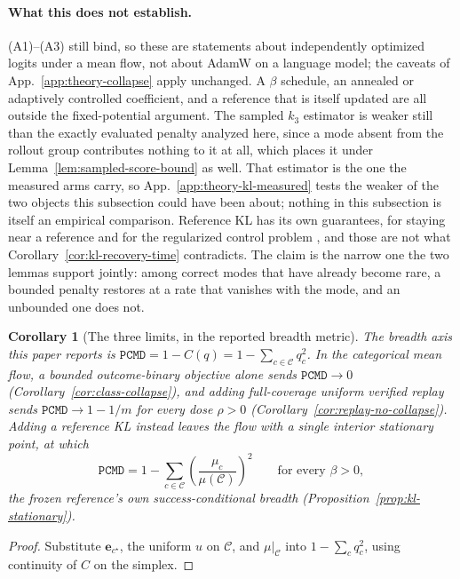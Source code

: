 \documentclass{article}
\newcommand{\1}{\mathbf 1}
\newcommand{\pmd}{\texttt{PCMD}}
\newtheorem{corollary}[lemma]{Corollary}
\theoremstyle{remark}
\theoremstyle{definition}
\theoremstyle{plain}
\begin{document}
\paragraph{What this does not establish.} (A1)--(A3) still bind, so these are
statements about independently optimized logits under a mean flow, not about
AdamW on a language model; the caveats of
App.~\ref{app:theory-collapse} apply unchanged. A $\beta$ schedule, an
annealed or adaptively controlled coefficient, and a reference that is itself
updated are all outside the fixed-potential argument. The sampled $k_3$
estimator is weaker still than the exactly evaluated penalty analyzed here,
since a mode absent from the rollout group contributes nothing to it at all,
which places it under Lemma~\ref{lem:sampled-score-bound} as well. That
estimator is the one the measured arms carry, so
App.~\ref{app:theory-kl-measured} tests the weaker of the two objects this
subsection could have been about; nothing in this subsection is itself an
empirical comparison. Reference KL has its own guarantees, for staying near
a reference and for the regularized control problem
\citep{geist2019regmdp,vieillard2020kl}, and those are not what
Corollary~\ref{cor:kl-recovery-time} contradicts. The claim is the narrow one
the two lemmas support jointly: among correct modes that have already become
rare, a bounded penalty restores at a rate that vanishes with the mode, and an
unbounded one does not.

\begin{corollary}[The three limits, in the reported breadth metric]
\label{cor:pmd-limits}
The breadth axis this paper reports is
$\pmd{}=1-C(q)=1-\sum_{c\in\mathcal C}q_c^2$. In the categorical mean flow, a
bounded outcome-binary objective alone sends $\pmd{}\to0$
(Corollary~\ref{cor:class-collapse}), and adding full-coverage uniform verified
replay sends $\pmd{}\to1-1/m$ for every dose $\rho>0$
(Corollary~\ref{cor:replay-no-collapse}). Adding a reference KL instead leaves
the flow with a single interior stationary point, at which
\[
 \pmd{}=1-\sum_{c\in\mathcal C}
   \left(\frac{\mu_c}{\mu(\mathcal C)}\right)^{\!2}
 \qquad\text{for every }\beta>0,
\]
the frozen reference's own success-conditional breadth
(Proposition~\ref{prop:kl-stationary}).
\end{corollary}

\begin{proof}
Substitute $\mathbf e_{c^\star}$, the uniform $u$ on $\mathcal C$, and
$\mu|_{\mathcal C}$ into $1-\sum_cq_c^2$, using continuity of $C$ on the
simplex.
\end{proof}
\end{document}
